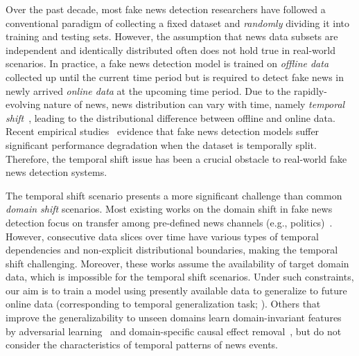 \documentclass[11pt]{article}
\begin{document}
Over the past decade, most fake news detection researchers have followed a conventional paradigm of collecting a fixed dataset and \textit{randomly} dividing it into training and testing sets. However, the assumption that news data subsets are independent and identically distributed often does not hold true in real-world scenarios.
In practice, a fake news detection model is trained on \textit{offline data} collected up until the current time period but is required to detect fake news in newly arrived \textit{online data} at the upcoming time period.
Due to the rapidly-evolving nature of news, news distribution can vary with time, namely \textit{temporal shift}~\cite{du2021adarnn,gaspers-etal-2022-temporal}, leading to the distributional difference between offline and online data.
Recent empirical studies~\cite{dual-emotion,mu-etal-2023-time} evidence that fake news detection models suffer significant performance degradation when the dataset is temporally split. Therefore, the temporal shift issue has been a crucial obstacle to real-world fake news detection systems.

The temporal shift scenario presents a more significant challenge than common \textit{domain shift} scenarios.
Most existing works on the domain shift in fake news detection focus on transfer among pre-defined news channels (e.g., politics)~\cite{silva2021embracing,shukai-www22,lin-etal-2022-detect,nan-coling}. However, consecutive data slices over time have various types of temporal dependencies and non-explicit distributional boundaries, making the temporal shift challenging. Moreover, these works assume the availability of target domain data, which is impossible for the temporal shift scenarios. Under such constraints,  our aim is to train a model using presently available data to generalize to future online data (corresponding to temporal generalization task; \citealp{dg-survey}).
Others that improve the generalizability to unseen domains learn domain-invariant features by adversarial learning~\cite{eann} and domain-specific causal effect removal~\cite{endef}, but do not consider the characteristics of temporal patterns of news events. 
\end{document}

